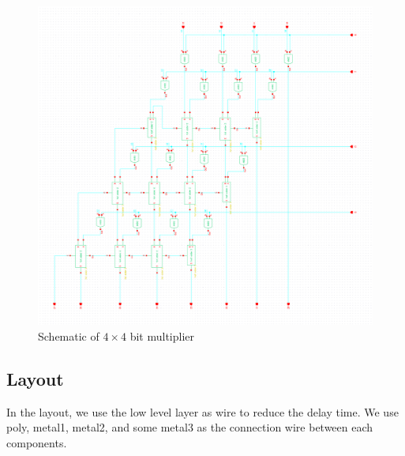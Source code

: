 \documentclass[conference]{IEEEtran}
\begin{document}
\begin{figure}[H]
    \centering
    \includegraphics[width=0.9\linewidth]{4X4_Multiplier_schematic.png}
    \caption{Schematic of $4 \times 4$ bit multiplier}
    \label{4X4_Multiplier_schematic}
\end{figure}

\subsection{Layout}

In the layout, we use the low level layer as wire to reduce the delay time. We use poly, metal1, metal2, and some metal3 as the connection wire between each components.
\end{document}
